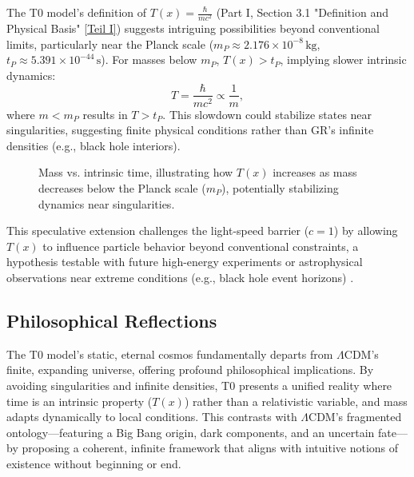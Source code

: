 \documentclass[12pt,a4paper]{article}
\newcommand{\Tfield}{T(x)}
\begin{document}
	The T0 model’s definition of \(\Tfield = \frac{\hbar}{m c^2}\) (Part I, Section 3.1 "Definition and Physical Basis" \href{https://github.com/jpascher/T0-Time-Mass-Duality/tree/main/2/pdf/English/Bridging Quantum Mechanics and Relativity through Time-Mass Duality Part I Theoretical Foundations_en.pdf}{[Teil I]}) suggests intriguing possibilities beyond conventional limits, particularly near the Planck scale (\(m_P \approx 2.176 \times 10^{-8} \, \text{kg}\), \(t_P \approx 5.391 \times 10^{-44} \, \text{s}\)). For masses below \(m_P\), \(\Tfield > t_P\), implying slower intrinsic dynamics:
	\begin{equation}
		T = \frac{\hbar}{m c^2} \propto \frac{1}{m},
		\label{eq:intrinsic_time_repeat}
	\end{equation}
	where \(m < m_P\) results in \(T > t_P\). This slowdown could stabilize states near singularities, suggesting finite physical conditions rather than GR’s infinite densities (e.g., black hole interiors).
	
	\begin{figure}[h]
		\centering
		\caption{Mass vs. intrinsic time, illustrating how \(\Tfield\) increases as mass decreases below the Planck scale (\(m_P\)), potentially stabilizing dynamics near singularities.}
		\label{fig:mass_time}
	\end{figure}
	
	This speculative extension challenges the light-speed barrier (\(c = 1\)) by allowing \(\Tfield\) to influence particle behavior beyond conventional constraints, a hypothesis testable with future high-energy experiments or astrophysical observations near extreme conditions (e.g., black hole event horizons) \cite{pascher_planck_2025}.
	
	\subsection{Philosophical Reflections}
	\label{subsec:philosophical_reflections}
	
	The T0 model’s static, eternal cosmos fundamentally departs from \(\Lambda\)CDM’s finite, expanding universe, offering profound philosophical implications. By avoiding singularities and infinite densities, T0 presents a unified reality where time is an intrinsic property (\(\Tfield\)) rather than a relativistic variable, and mass adapts dynamically to local conditions. This contrasts with \(\Lambda\)CDM’s fragmented ontology—featuring a Big Bang origin, dark components, and an uncertain fate—by proposing a coherent, infinite framework that aligns with intuitive notions of existence without beginning or end.
	
\end{document}
